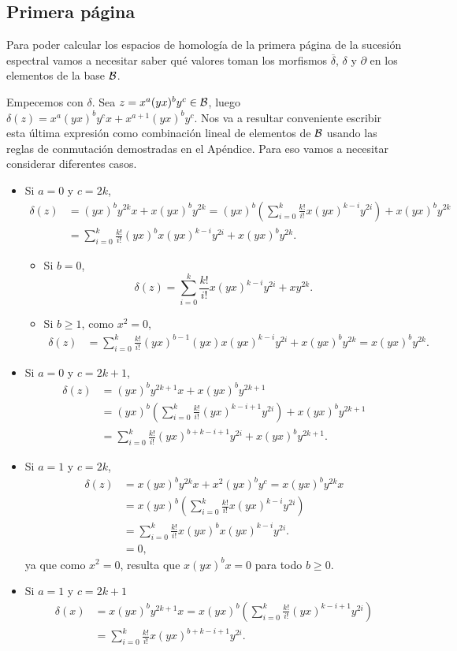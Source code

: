 \documentclass[fleqn,../tesis.tex]{subfiles}
\begin{document}
\subsection{Primera página}
Para poder calcular los espacios de homología de la primera página de la sucesión espectral
vamos a necesitar saber qué valores toman los morfismos $\overline{\delta}$, $\delta$ y $\partial$
en los elementos de la base $\mathcal{B}$.

Empecemos con $\delta$. Sea $z = x^a(yx)^by^c \in \mathcal{B}$, luego $\delta(z) = x^a(yx)^by^cx + x^{a + 1}(yx)^by^c$. Nos va a
resultar conveniente escribir esta última expresión como combinación lineal de elementos de $\mathcal{B}$ usando
las reglas de conmutación demostradas en el Apéndice. Para eso vamos a necesitar considerar
diferentes casos.
\begin{itemize}
	\item Si $a = 0$ y $c = 2k$,
	\begin{align*}
		\delta(z) &= (yx)^by^{2k}x + x(yx)^by^{2k}
			= (yx)^b\left( \sum_{i = 0}^k\frac{k!}{i!}x(yx)^{k - i}y^{2i}\right) + x(yx)^by^{2k} \\
		&= \sum_{i = 0}^k\frac{k!}{i!}(yx)^bx(yx)^{k - i}y^{2i} + x(yx)^by^{2k}. 
	\end{align*}
	\begin{itemize}
		\item Si $b = 0$,
		\[
			\delta(z) = \sum_{i = 0}^k\frac{k!}{i!}x(yx)^{k - i}y^{2i} + xy^{2k}.
		\]
		\item Si $b \geq 1$, como $x^2 = 0$,
		\begin{align*}
			\delta(z) &= \sum_{i = 0}^k\frac{k!}{i!}(yx)^{b-1}(yx)x(yx)^{k - i}y^{2i} + x(yx)^by^{2k} = x(yx)^by^{2k}.
		\end{align*}
	\end{itemize}
	\item Si $a = 0$ y $c = 2k + 1$,
	\begin{align*}
		\delta(z) &= (yx)^by^{2k + 1}x + x(yx)^by^{2k + 1} \\
		&= (yx)^b\left( \sum_{i = 0}^k\frac{k!}{i!}(yx)^{k - i + 1}y^{2i}\right) + x(yx)^by^{2k + 1} \\
		&= \sum_{i = 0}^k\frac{k!}{i!}(yx)^{b + k - i + 1}y^{2i} + x(yx)^by^{2k + 1}.
	\end{align*}
	\item Si $a = 1$ y $c = 2k$,
		\begin{align*}
			\delta(z) &= x(yx)^by^{2k}x + x^2(yx)^by^c = x(yx)^by^{2k}x \\
			&= x(yx)^b\left( \sum_{i = 0}^k\frac{k!}{i!}x(yx)^{k - i}y^{2i}\right) \\
			&= \sum_{i = 0}^k\frac{k!}{i!}x(yx)^bx(yx)^{k - i}y^{2i}. \\
			& = 0,
		\end{align*}
		ya que como $x^2 = 0$, resulta que $x(yx)^bx = 0$ para todo $b \geq 0$.
	\item Si $a = 1$ y $c = 2k + 1$
	\begin{align*}
		\delta(x) &= x(yx)^by^{2k + 1}x = x(yx)^b\left( \sum_{i = 0}^k\frac{k!}{i!}(yx)^{k - i + 1}y^{2i}\right) \\
		&= \sum_{i = 0}^k\frac{k!}{i!}x(yx)^{b + k - i + 1}y^{2i}.
	\end{align*}
\end{itemize}
\end{document}
